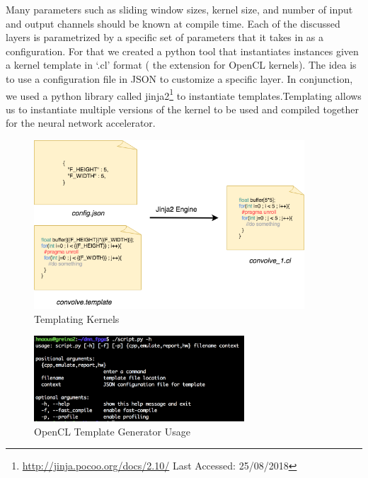 Many parameters such as sliding window sizes, kernel size, and number of input and output channels should be known at compile time. Each of the discussed layers is parametrized by a specific set of parameters that it takes in as a configuration. For that we created a python tool that instantiates instances  given a kernel template in ‘.cl’ format ( the extension for OpenCL kernels). The idea is to use a configuration file in JSON to customize a specific layer. In conjunction, we used a python library called jinja2\footnote{\url{http://jinja.pocoo.org/docs/2.10/} Last Accessed: 25/08/2018} to instantiate templates.Templating allows us to instantiate multiple versions of the kernel to be used and compiled together for the neural network accelerator.


\begin{figure}[h!]
\centering
\includegraphics[width=0.9\textwidth]{Figures/jinja}
\decoRule
\caption[comm]{ Templating Kernels }
\label{fig:jinja}
\end{figure}

\begin{figure}[h!]
\centering
\includegraphics[width=0.7\textwidth]{Figures/usage}
\decoRule
\caption[comm]{ OpenCL Template Generator Usage }
\label{fig:usage}
\end{figure}

